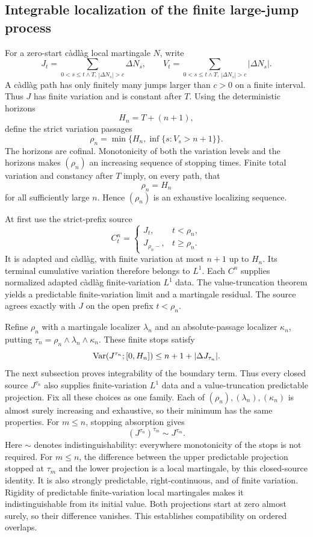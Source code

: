 \subsection{Integrable localization of the finite large-jump process}
For a zero-start c\`adl\`ag local martingale $N$, write
\[
 J_t=\sum_{0<s\leq t\wedge T,\,|\Delta N_s|>c}\Delta N_s,
 \qquad
 V_t=\sum_{0<s\leq t\wedge T,\,|\Delta N_s|>c}|\Delta N_s|.
\]
A c\`adl\`ag path has only finitely many jumps larger than $c>0$ on a
finite interval. Thus $J$ has finite variation and is constant after $T$.
Using the deterministic horizons
\[
 H_n=T+(n+1),
\]
define the strict variation passages
\[
 \rho_n=\min\{H_n,\inf\{s:V_s>n+1\}\}.
\]
The horizons are cofinal. Monotonicity of both the variation levels and
the horizons makes $(\rho_n)$ an increasing sequence of stopping times.
Finite total variation and constancy after $T$ imply, on every path, that
\[
 \rho_n=H_n
\]
for all sufficiently large $n$. Hence $(\rho_n)$ is an exhaustive localizing
sequence.

At first use the strict-prefix source
\[
 C^n_t=\begin{cases}
 J_t,&t<\rho_n,\\
 J_{\rho_n-},&t\geq\rho_n.
 \end{cases}
\]
It is adapted and c\`adl\`ag, with finite variation at most $n+1$ up to
$H_n$. Its terminal cumulative variation therefore belongs to $L^1$.
Each $C^n$ supplies normalized adapted c\`adl\`ag finite-variation $L^1$
data. The value-truncation theorem yields a predictable finite-variation
limit and a martingale residual. The source agrees exactly with $J$ on
the open prefix $t<\rho_n$.

Refine $\rho_n$ with a martingale localizer $\lambda_n$ and an
absolute-passage localizer $\kappa_n$, putting
$\tau_n=\rho_n\wedge\lambda_n\wedge\kappa_n$. These finite stops satisfy
\[
 \operatorname{Var}(J^{\tau_n};[0,H_n])\leq n+1+|\Delta J_{\tau_n}|.
\]
The next subsection proves integrability of the boundary term.
Thus every closed source $J^{\tau_n}$ also supplies finite-variation $L^1$
data and a value-truncation predictable projection. Fix all these choices
as one family. Each of $(\rho_n),(\lambda_n),(\kappa_n)$ is almost surely
increasing and exhaustive, so their minimum has the same properties.
For $m\leq n$, stopping absorption gives
\[
 (J^{\tau_n})^{\tau_m}\sim J^{\tau_m}.
\]
Here $\sim$ denotes indistinguishability: everywhere monotonicity of the
stops is not required.
For $m\leq n$, the difference between the upper predictable projection
stopped at $\tau_m$ and the lower projection is a local martingale, by this
closed-source identity. It is also strongly predictable, right-continuous,
and of finite variation. Rigidity of predictable finite-variation local
martingales makes it indistinguishable from its initial value. Both
projections start at zero almost surely, so their difference vanishes.
This establishes compatibility on ordered overlaps.
